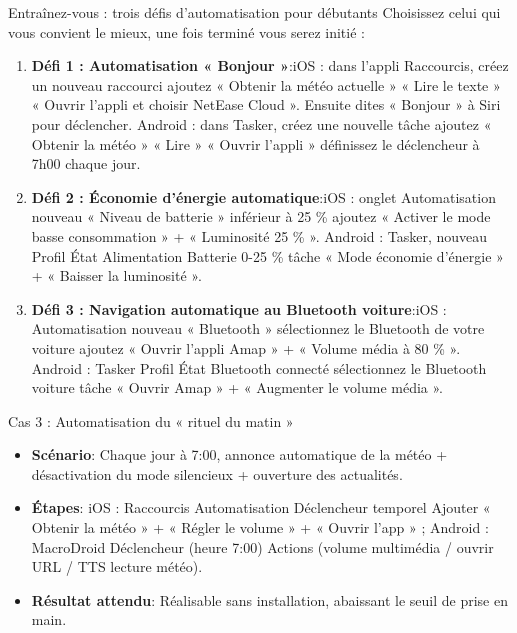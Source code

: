 \begin{tcbpractice}{Entraînez-vous : trois défis d'automatisation pour débutants}
Choisissez celui qui vous convient le mieux, une fois terminé vous serez initié :

\begin{enumerate}
  \item \textbf{Défi 1 : Automatisation « Bonjour »}:iOS : dans l’appli Raccourcis, créez un nouveau raccourci ajoutez « Obtenir la météo actuelle » « Lire le texte » « Ouvrir l’appli et choisir NetEase Cloud ». Ensuite dites « Bonjour » à Siri pour déclencher. Android : dans Tasker, créez une nouvelle tâche ajoutez « Obtenir la météo » « Lire » « Ouvrir l’appli » définissez le déclencheur à 7h00 chaque jour.
  \item \textbf{Défi 2 : Économie d’énergie automatique}:iOS : onglet Automatisation nouveau « Niveau de batterie » inférieur à 25 \% ajoutez « Activer le mode basse consommation » + « Luminosité 25 \% ». Android : Tasker, nouveau Profil État Alimentation Batterie 0-25 \% tâche « Mode économie d’énergie » + « Baisser la luminosité ».
  \item \textbf{Défi 3 : Navigation automatique au Bluetooth voiture}:iOS : Automatisation nouveau « Bluetooth » sélectionnez le Bluetooth de votre voiture ajoutez « Ouvrir l’appli Amap » + « Volume média à 80 \% ». Android : Tasker Profil État Bluetooth connecté sélectionnez le Bluetooth voiture tâche « Ouvrir Amap » + « Augmenter le volume média ».
\end{enumerate}

\end{tcbpractice}

\begin{tcbinfo}{Cas 3 : Automatisation du « rituel du matin »}
\begin{itemize}
  \item \textbf{Scénario}: Chaque jour à 7:00, annonce automatique de la météo + désactivation du mode silencieux + ouverture des actualités.
  \item \textbf{Étapes}: iOS : Raccourcis Automatisation Déclencheur temporel Ajouter « Obtenir la météo » + « Régler le volume » + « Ouvrir l'app » ; Android : MacroDroid Déclencheur (heure 7:00) Actions (volume multimédia / ouvrir URL / TTS lecture météo).
  \item \textbf{Résultat attendu}: Réalisable sans installation, abaissant le seuil de prise en main.
\end{itemize}

\end{tcbinfo}
